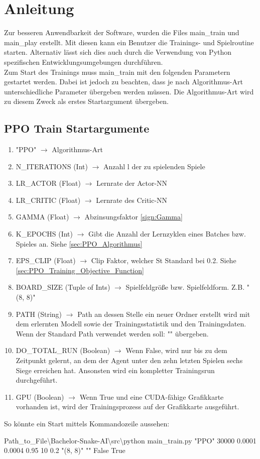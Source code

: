 \chapter{Anleitung}
Zur besseren Anwendbarkeit der Software, wurden die Files main\_train und main\_play erstellt. Mit diesen kann ein Benutzer die Trainings- und Spielroutine starten. Alternativ lässt sich dies auch durch die Verwendung von Python spezifischen Entwicklungsumgebungen durchführen.\\
Zum Start des Trainings muss  main\_train mit den folgenden Parametern gestartet werden. Dabei ist jedoch zu beachten, dass je nach Algorithmus-Art unterschiedliche Parameter übergeben werden müssen. Die Algorithmus-Art wird zu diesem Zweck als erstes Startargument übergeben.

\section{PPO Train Startargumente} 
\begin{enumerate}
	\item "PPO" $\longrightarrow$ Algorithmus-Art
	\item N\_ITERATIONS (Int) $\longrightarrow$ Anzahl l der zu spielenden Spiele
	\item LR\_ACTOR (Float) $\longrightarrow$ Lernrate der Actor-NN
	\item LR\_CRITIC (Float) $\longrightarrow$ Lernrate des Critic-NN
	\item GAMMA (Float) $\longrightarrow$ Abzinsungsfaktor \ref{sign:Gamma}
	\item K\_EPOCHS (Int) $\longrightarrow$ Gibt die Anzahl der  Lernzyklen eines Batches bzw. Spieles an. Siehe \ref{sec:PPO_Algorithmus}
	\item EPS\_CLIP (Float) $\longrightarrow$ Clip Faktor, welcher St Standard bei 0.2. Siehe \ref{sec:PPO_Training_Objective_Function}
	\item BOARD\_SIZE (Tuple of Ints) $\longrightarrow$ Spielfeldgröße bzw. Spielfeldform. Z.B. "(8, 8)"
	\item PATH (String) $\longrightarrow$ Path an dessen Stelle ein neuer Ordner erstellt wird mit dem erlernten Modell sowie der Trainingsstatistik und den Trainingsdaten. Wenn der Standard Path verwendet werden soll: "" übergeben.
	\item DO\_TOTAL\_RUN (Boolean) $\longrightarrow$ Wenn False, wird nur bis zu dem Zeitpunkt gelernt, an dem der Agent unter den zehn letzten Spielen sechs Siege erreichen hat. Ansonsten wird ein kompletter Trainingsrun durchgeführt.
	\item GPU (Boolean) $\longrightarrow$ Wenn True und eine CUDA-fähige Grafikkarte vorhanden ist, wird der Trainingsprozess auf der Grafikkarte ausgeführt.
\end{enumerate}
So könnte ein Start mittels Kommandozeile aussehen:
\begin{center}
	Path\_to\_File\textbackslash Bachelor-Snake-AI\textbackslash src\textbackslash python main\_train.py "PPO"{} 30000 0.0001 0.0004 0.95 10 0.2 "(8, 8)"{} ""{} False True
\end{center}

